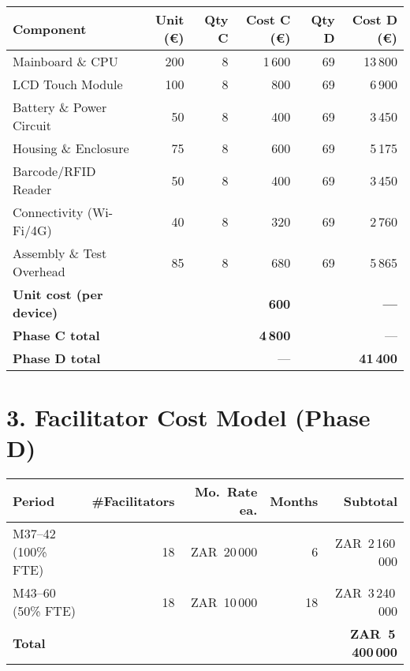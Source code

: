 \documentclass[a4paper,11pt]{article}
\begin{document}
\begin{tabularx}{\textwidth}{Xrrrrr}
\toprule
\textbf{Component}           & \textbf{Unit (€)} & \textbf{Qty C} & \textbf{Cost C (€)} & \textbf{Qty D} & \textbf{Cost D (€)} \\
\midrule
Mainboard \& CPU             & 200               & 8              & 1\,600               & 69             & 13\,800              \\
LCD Touch Module             & 100               & 8              &   800                & 69             &  6\,900              \\
Battery \& Power Circuit     &  50               & 8              &   400                & 69             &  3\,450              \\
Housing \& Enclosure         &  75               & 8              &   600                & 69             &  5\,175              \\
Barcode/RFID Reader          &  50               & 8              &   400                & 69             &  3\,450              \\
Connectivity (Wi-Fi/4G)      &  40               & 8              &   320                & 69             &  2\,760              \\
Assembly \& Test Overhead    &  85               & 8              &   680                & 69             &  5\,865              \\
\midrule
\textbf{Unit cost (per device)} &           &                & \textbf{600}         &                & \textbf{—}          \\
\textbf{Phase C total}       &                   &                & \textbf{4\,800}      &                & —                    \\
\textbf{Phase D total}       &                   &                & —                    &                & \textbf{41\,400}     \\
\bottomrule
\end{tabularx}

\section*{3. Facilitator Cost Model (Phase D)}
\begin{tabularx}{\textwidth}{Xrrrr}
\toprule
\textbf{Period} & \textbf{\#Facilitators} & \textbf{Mo.\ Rate ea.} & \textbf{Months} & \textbf{Subtotal} \\
\midrule
M37--42 (100\% FTE) & 18 & ZAR~20\,000 & 6  & ZAR~2\,160\,000 \\
M43--60 (50\% FTE)  & 18 & ZAR~10\,000 & 18 & ZAR~3\,240\,000 \\
\midrule
\textbf{Total}     &    &             &    & \textbf{ZAR~5\,400\,000} \\
\bottomrule
\end{tabularx}
\end{document}
